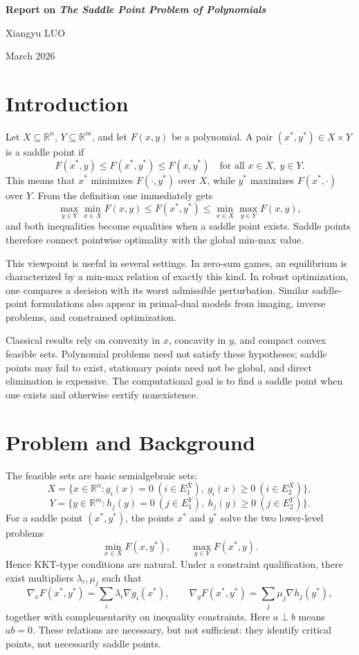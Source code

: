 \documentclass[11pt]{article}
\newcommand{\R}{\mathbb{R}}
\begin{document}
{\centering
\Large\bfseries Report on \emph{The Saddle Point Problem of Polynomials}\par
\vspace{0.15em}
\normalsize Xiangyu LUO\par
\normalsize March 2026\par
}
\vspace{0.1em}

\section{Introduction}
Let $X \subseteq \R^n$, $Y \subseteq \R^m$, and let $F(x,y)$ be a polynomial. A pair $(x^\ast,y^\ast) \in X \times Y$ is a saddle point if
\[
F(x^\ast,y) \leq F(x^\ast,y^\ast) \leq F(x,y^\ast)
\quad
\text{for all } x \in X,\ y \in Y.
\]
This means that $x^\ast$ minimizes $F(\cdot,y^\ast)$ over $X$, while $y^\ast$ maximizes $F(x^\ast,\cdot)$ over $Y$. From the definition one immediately gets
\[
\max_{y \in Y}\min_{x \in X} F(x,y) \leq F(x^\ast,y^\ast) \leq \min_{x \in X}\max_{y \in Y} F(x,y),
\]
and both inequalities become equalities when a saddle point exists. Saddle points therefore connect pointwise optimality with the global min-max value.

This viewpoint is useful in several settings. In zero-sum games, an equilibrium is characterized by a min-max relation of exactly this kind. In robust optimization, one compares a decision with its worst admissible perturbation. Similar saddle-point formulations also appear in primal-dual models from imaging, inverse problems, and constrained optimization.

Classical results rely on convexity in $x$, concavity in $y$, and compact convex feasible sets. Polynomial problems need not satisfy these hypotheses; saddle points may fail to exist, stationary points need not be global, and direct elimination is expensive. The computational goal is to find a saddle point when one exists and otherwise certify nonexistence.

\section{Problem and Background}
The feasible sets are basic semialgebraic sets:
\[
X=\{x \in \R^n : g_i(x)=0 \ (i \in E_1^X),\ g_i(x)\ge 0 \ (i \in E_2^X)\},
\]
\[
Y=\{y \in \R^m : h_j(y)=0 \ (j \in E_1^Y),\ h_j(y)\ge 0 \ (j \in E_2^Y)\}.
\]
For a saddle point $(x^\ast,y^\ast)$, the points $x^\ast$ and $y^\ast$ solve the two lower-level problems
\[
\min_{x \in X} F(x,y^\ast),
\qquad
\max_{y \in Y} F(x^\ast,y).
\]
Hence KKT-type conditions are natural. Under a constraint qualification, there exist multipliers $\lambda_i,\mu_j$ such that
\[
\nabla_x F(x^\ast,y^\ast)=\sum_i \lambda_i \nabla g_i(x^\ast),
\qquad
\nabla_y F(x^\ast,y^\ast)=\sum_j \mu_j \nabla h_j(y^\ast),
\]
together with complementarity on inequality constraints. Here $a\perp b$ means $ab=0$. These relations are necessary, but not sufficient: they identify critical points, not necessarily saddle points.
\end{document}

